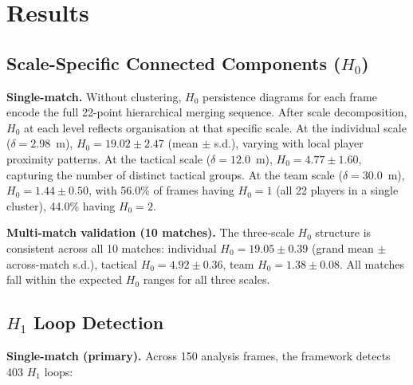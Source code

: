 \section{Results}
\label{sec:results}

\subsection{Scale-Specific Connected Components (\(H_0\))}
\label{sec:scale_h0}

\textbf{Single-match.} Without clustering, \(H_0\) persistence diagrams for each frame encode the full 22-point hierarchical merging sequence. After scale decomposition, \(H_0\) at each level reflects organisation at that specific scale. At the individual scale (\(\delta=2.98\)~m), \(H_0=19.02\pm2.47\) (mean \(\pm\) s.d.), varying with local player proximity patterns. At the tactical scale (\(\delta=12.0\)~m), \(H_0=4.77\pm1.60\), capturing the number of distinct tactical groups. At the team scale (\(\delta=30.0\)~m), \(H_0=1.44\pm0.50\), with 56.0\% of frames having \(H_0=1\) (all 22 players in a single cluster), 44.0\% having \(H_0=2\).

\textbf{Multi-match validation (10 matches).} The three-scale \(H_0\) structure is consistent across all 10 matches: individual \(H_0=19.05\pm0.39\) (grand mean \(\pm\) across-match s.d.), tactical \(H_0=4.92\pm0.36\), team \(H_0=1.38\pm0.08\). All matches fall within the expected \(H_0\) ranges for all three scales.

\subsection{\(H_1\) Loop Detection}

\textbf{Single-match (primary).} Across 150 analysis frames, the framework detects 403 \(H_1\) loops:

\begin{table}[H]
  \centering
  \caption{Single-match \texorpdfstring{$H_1$}{H1} statistics (primary match, 150 frames).}
  \label{tab:h1single}
\end{table}

